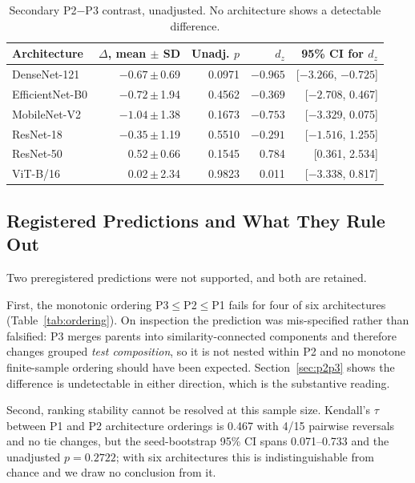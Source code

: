 \documentclass[conference]{IEEEtran}
\newcommand{\meanpm}[2]{#1\,$\pm$\,#2}
\newcommand{\protocol}[1]{\textsf{#1}}
\begin{document}
\begin{table}[t]
\caption{Secondary \protocol{P2}$-$\protocol{P3} contrast, unadjusted. No architecture shows a detectable difference.}
\label{tab:p2p3}
\centering
\scriptsize
\setlength{\tabcolsep}{3.6pt}
\begin{tabular}{lrrrr}
\toprule
Architecture & $\Delta$, mean $\pm$ SD & Unadj. $p$ & $d_z$ & 95\% CI for $d_z$ \\
\midrule
DenseNet-121 & \meanpm{$-0.67$}{0.69} & 0.0971 & $-0.965$ & [$-3.266$, $-0.725$] \\
EfficientNet-B0 & \meanpm{$-0.72$}{1.94} & 0.4562 & $-0.369$ & [$-2.708$, 0.467] \\
MobileNet-V2 & \meanpm{$-1.04$}{1.38} & 0.1673 & $-0.753$ & [$-3.329$, 0.075] \\
ResNet-18 & \meanpm{$-0.35$}{1.19} & 0.5510 & $-0.291$ & [$-1.516$, 1.255] \\
ResNet-50 & \meanpm{0.52}{0.66} & 0.1545 & 0.784 & [0.361, 2.534] \\
ViT-B/16 & \meanpm{0.02}{2.34} & 0.9823 & 0.011 & [$-3.338$, 0.817] \\
\bottomrule
\end{tabular}
\end{table}

\subsection{Registered Predictions and What They Rule Out}
Two preregistered predictions were not supported, and both are retained.

First, the monotonic ordering \protocol{P3}$\leq$\protocol{P2}$\leq$\protocol{P1} fails for four of six architectures (Table~\ref{tab:ordering}).
On inspection the prediction was mis-specified rather than falsified: \protocol{P3} merges parents into similarity-connected components and therefore changes grouped \emph{test composition}, so it is not nested within \protocol{P2} and no monotone finite-sample ordering should have been expected.
Section~\ref{sec:p2p3} shows the difference is undetectable in either direction, which is the substantive reading.

Second, ranking stability cannot be resolved at this sample size.
Kendall's $\tau$ between \protocol{P1} and \protocol{P2} architecture orderings is 0.467 with 4/15 pairwise reversals and no tie changes, but the seed-bootstrap 95\% CI spans 0.071--0.733 and the unadjusted $p=0.2722$; with six architectures this is indistinguishable from chance and we draw no conclusion from it.
\end{document}
